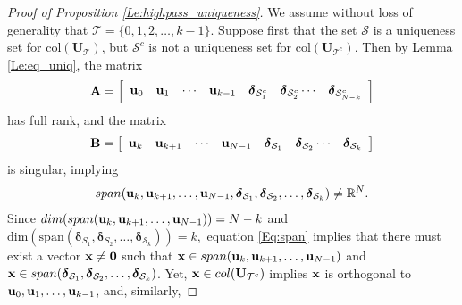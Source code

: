 \documentclass[journal, 10pt]{IEEEtran}
\begin{document}
{
\begin{proof}[Proof of Proposition \ref{Le:highpass_uniqueness}]
We assume without loss of generality that ${\mathcal T}=\{0,1,2,\ldots,k-1\}$. 
Suppose first that the set $\mathcal{S}$ is a uniqueness set for $\mbox{col}({\mathbf{U}}_{\mathcal T})$, but $\mathcal{S}^c$ is not a uniqueness set for $\mbox{col}({\mathbf{U}}_{{\mathcal T}^c})$. Then by Lemma \ref{Le:eq_uniq}, the matrix $$\mathbf{A}=
 \left[ \begin{array}{cccccccc}
{\bf u}_{0} & {\bf u}_{1} & \cdots & {\bf u}_{k-1} & {\boldsymbol \delta}_{{\mathcal{S}}^c_1} & {\boldsymbol \delta}_{{\mathcal{S}}^c_2} \cdots & {\boldsymbol \delta}_{{\mathcal{S}}^c_{N-k}} \end{array} \right]$$
has full rank, and the matrix $$\mathbf{B}=
 \left[ \begin{array}{cccccccc}
{\bf u}_{k} & {\bf u}_{k+1} & \cdots & {\bf u}_{N-1} & {\boldsymbol \delta}_{\mathcal{S}_{1}} & {\boldsymbol \delta}_{\mathcal{S}_{2}} \cdots & {\boldsymbol \delta}_{\mathcal{S}_k} \end{array} \right]$$
is singular, implying
\begin{align}\label{Eq:span}
\mbox{span}({\bf u}_{k}, {\bf u}_{k+1},\ldots, {\bf u}_{N-1}, {\boldsymbol \delta}_{\mathcal{S}_{1}}, {\boldsymbol \delta}_{\mathcal{S}_{2}}, \ldots, {\boldsymbol \delta}_{\mathcal{S}_k}) \neq \mathbb{R}^N.
\end{align}
Since 
$\mbox{dim}(\mbox{span}({\bf u}_{k}, {\bf u}_{k+1},\ldots, {\bf u}_{N-1}))=N-k$ and $\mbox{dim}(\mbox{span}({\boldsymbol \delta}_{S_{1}}, {\boldsymbol \delta}_{S_{2}}, \ldots, {\boldsymbol \delta}_{\mathcal{S}_k}))=k,$ equation 
\eqref{Eq:span} implies that
there must exist a vector ${\bf x} \neq {\bf 0}$ such that 
${\bf x} \in  \mbox{span}({\bf u}_{k}, {\bf u}_{k+1},\ldots, {\bf u}_{N-1})$ and  
$ {\bf x} \in \mbox{span}({\boldsymbol \delta}_{\mathcal{S}_{1}}, {\boldsymbol \delta}_{\mathcal{S}_{2}}, \ldots, {\boldsymbol \delta}_{\mathcal{S}_{k}})$.%
Yet, ${\bf x} \in \mbox{col}({\mathbf{U}}_{{\mathcal T}^c})$ implies ${\bf x}$ is orthogonal to  ${\bf u}_0, {\bf u}_1, \ldots, {\bf u}_{k-1}$, and, similarly, 

\end{proof}}
\end{document}
